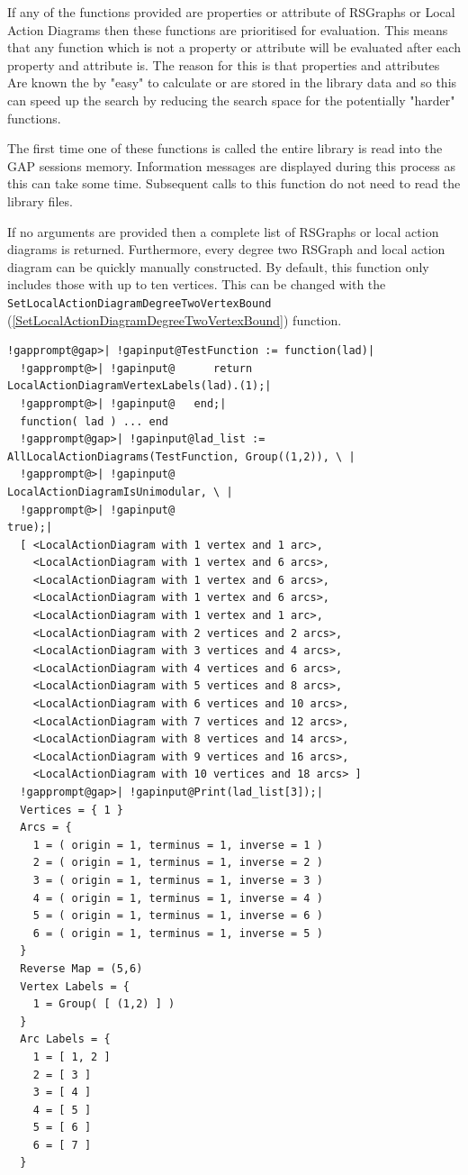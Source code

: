 \documentclass[a4paper,11pt]{report}
\begin{document}
{{{ If any of the functions provided are properties or attribute of RSGraphs or
Local Action Diagrams then these functions are prioritised for evaluation.
This means that any function which is not a property or attribute will be
evaluated after each property and attribute is. The reason for this is that
properties and attributes Are known the by "easy" to calculate or are stored
in the library data and so this can speed up the search by reducing the search
space for the potentially "harder" functions. 

 The first time one of these functions is called the entire library is read
into the GAP sessions memory. Information messages are displayed during this
process as this can take some time. Subsequent calls to this function do not
need to read the library files. 

 If no arguments are provided then a complete list of RSGraphs or local action
diagrams is returned. Furthermore, every degree two RSGraph and local action
diagram can be quickly manually constructed. By default, this function only
includes those with up to ten vertices. This can be changed with the \texttt{SetLocalActionDiagramDegreeTwoVertexBound} (\ref{SetLocalActionDiagramDegreeTwoVertexBound}) function. }

 

 
\begin{Verbatim}[commandchars=!@|,fontsize=\small,frame=single,label=Example]
  !gapprompt@gap>| !gapinput@TestFunction := function(lad)|
  !gapprompt@>| !gapinput@   	return LocalActionDiagramVertexLabels(lad).(1);|
  !gapprompt@>| !gapinput@   end;|
  function( lad ) ... end
  !gapprompt@gap>| !gapinput@lad_list := AllLocalActionDiagrams(TestFunction, Group((1,2)), \ |
  !gapprompt@>| !gapinput@                                      LocalActionDiagramIsUnimodular, \ |
  !gapprompt@>| !gapinput@                                      true);|
  [ <LocalActionDiagram with 1 vertex and 1 arc>, 
    <LocalActionDiagram with 1 vertex and 6 arcs>, 
    <LocalActionDiagram with 1 vertex and 6 arcs>, 
    <LocalActionDiagram with 1 vertex and 6 arcs>, 
    <LocalActionDiagram with 1 vertex and 1 arc>, 
    <LocalActionDiagram with 2 vertices and 2 arcs>, 
    <LocalActionDiagram with 3 vertices and 4 arcs>, 
    <LocalActionDiagram with 4 vertices and 6 arcs>, 
    <LocalActionDiagram with 5 vertices and 8 arcs>, 
    <LocalActionDiagram with 6 vertices and 10 arcs>, 
    <LocalActionDiagram with 7 vertices and 12 arcs>, 
    <LocalActionDiagram with 8 vertices and 14 arcs>, 
    <LocalActionDiagram with 9 vertices and 16 arcs>, 
    <LocalActionDiagram with 10 vertices and 18 arcs> ]
  !gapprompt@gap>| !gapinput@Print(lad_list[3]);|
  Vertices = { 1 }
  Arcs = {
  	1 = ( origin = 1, terminus = 1, inverse = 1 )
  	2 = ( origin = 1, terminus = 1, inverse = 2 )
  	3 = ( origin = 1, terminus = 1, inverse = 3 )
  	4 = ( origin = 1, terminus = 1, inverse = 4 )
  	5 = ( origin = 1, terminus = 1, inverse = 6 )
  	6 = ( origin = 1, terminus = 1, inverse = 5 )
  }
  Reverse Map = (5,6)
  Vertex Labels = {
  	1 = Group( [ (1,2) ] )
  }
  Arc Labels = {
  	1 = [ 1, 2 ]
  	2 = [ 3 ]
  	3 = [ 4 ]
  	4 = [ 5 ]
  	5 = [ 6 ]
  	6 = [ 7 ]
  }
\end{Verbatim}
 
}}
\end{document}
